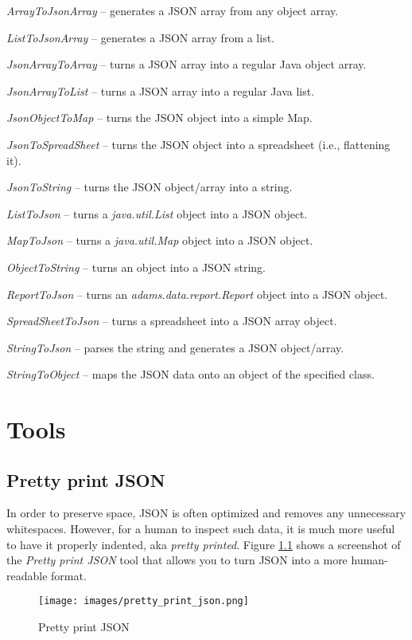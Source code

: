 \documentclass[a4paper]{book}
\begin{document}
\begin{tight_itemize}
	\item \textit{ArrayToJsonArray} -- generates a JSON array from any object array.
	\item \textit{ListToJsonArray} -- generates a JSON array from a list.
	\item \textit{JsonArrayToArray} -- turns a JSON array into a regular Java object array.
	\item \textit{JsonArrayToList} -- turns a JSON array into a regular Java list.
	\item \textit{JsonObjectToMap} -- turns the JSON object into a simple Map.
	\item \textit{JsonToSpreadSheet} -- turns the JSON object into a spreadsheet (i.e., flattening it).
	\item \textit{JsonToString} -- turns the JSON object/array into a string.
	\item \textit{ListToJson} -- turns a \textit{java.util.List} object	into a JSON object.
	\item \textit{MapToJson} -- turns a \textit{java.util.Map} object into a JSON object.
	\item \textit{ObjectToString} -- turns an object into a JSON string.
	\item \textit{ReportToJson} -- turns an \textit{adams.data.report.Report} object into a JSON object.
	\item \textit{SpreadSheetToJson} -- turns a spreadsheet into a JSON array object.
	\item \textit{StringToJson} -- parses the string and generates a JSON object/array.
	\item \textit{StringToObject} -- maps the JSON data onto an object of the specified class.
\end{tight_itemize}

\chapter{Tools}

\section{Pretty print JSON}
In order to preserve space, JSON is often optimized and removes any unnecessary
whitespaces. However, for a human to inspect such data, it is much more useful
to have it properly indented, aka \textit{pretty printed}. Figure \ref{pretty_print_json}
shows a screenshot of the \textit{Pretty print JSON} tool that allows you to
turn JSON into a more human-readable format.
\begin{figure}[htb]
  \centering
  \texttt{[image: images/pretty\_print\_json.png]}
  \caption{Pretty print JSON}
  \label{pretty_print_json}
\end{figure}
\end{document}
